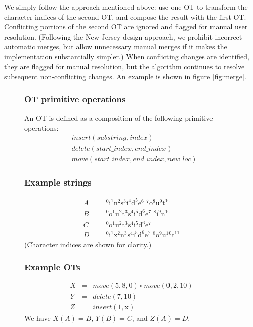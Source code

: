 \documentclass[11pt,titlepage]{article}
\begin{document}
We simply follow the approach mentioned above: use one OT to transform
the character indices of the second OT, and compose the result with
the first OT.  Conflicting portions of the second OT are ignored and
flagged for manual user resolution.  (Following the New Jersey design
approach, we prohibit incorrect automatic merges, but allow
unnecessary manual merges if it makes the implementation substantially
simpler.)  When conflicting changes are identified, they are flagged
for manual resolution, but the algorithm continues to resolve
subsequent non-conflicting changes.  An example is shown in figure
\ref{fig:merge}.

\begin{figure}[h]
  \centering
  \begin{minipage}{\textwidth}
    \begin{multicols}{2}
      \setlength{\parskip}{-6pt}
      \subsubsection*{OT primitive operations}
      An OT is defined as a composition of the following primitive
      operations:
      \begin{eqnarray*}
        &insert(substring, index) \\
        &delete(start\_index, end\_index) \\
        &move(start\_index, end\_index, new\_loc)
      \end{eqnarray*}      
      \subsubsection*{Example strings}
      \begin{eqnarray*}
        A &=& \mathrm{^0i^1n^2s^3i^4d^5e^6\_^7o^8u^9t^{10}} \\
        B &=& \mathrm{^0o^1u^2t^3s^4i^5d^6e^7\_^8i^9n^{10}} \\
        C &=& \mathrm{^0o^1u^2t^3s^4i^5d^6e^7} \\
        D &=& \mathrm{^0i^1x^2n^3s^4i^5d^6e^7\_^8o^9u^{10}t^{11}}
      \end{eqnarray*}
      (Character indices are shown for clarity.)
      \subsubsection*{Example OTs}
      \begin{eqnarray*}
        X &=& move(5, 8, 0) \circ move(0, 2, 10) \\
        Y &=& delete(7, 10) \\
        Z &=& insert(1, \mathrm{x})
      \end{eqnarray*}
      We have \(X(A) = B\), \(Y(B) = C\), and \(Z(A) = D\).

\end{multicols}
\end{minipage}
\end{figure}
\end{document}
